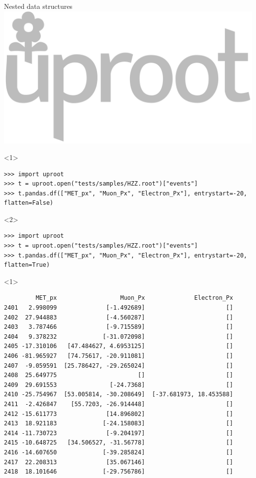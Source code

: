 \documentclass[aspectratio=169]{beamer}
\begin{document}
\begin{frame}[fragile]{Nested data structures}
\tiny
\vspace{0.25 cm}
\hfill \includegraphics[height=1 cm]{uproot-logo.pdf}

\vspace{-1.1 cm}
\begin{onlyenv}<1>\begin{verbatim}
>>> import uproot
>>> t = uproot.open("tests/samples/HZZ.root")["events"]
>>> t.pandas.df(["MET_px", "Muon_Px", "Electron_Px"], entrystart=-20, flatten=False)
\end{verbatim}
\end{onlyenv}\begin{onlyenv}<2>\begin{verbatim}
>>> import uproot
>>> t = uproot.open("tests/samples/HZZ.root")["events"]
>>> t.pandas.df(["MET_px", "Muon_Px", "Electron_Px"], entrystart=-20, flatten=True)
\end{verbatim}
\end{onlyenv}
\begin{onlyenv}<1>\begin{verbatim}
         MET_px                  Muon_Px              Electron_Px
2401   2.998099              [-1.492689]                       []
2402  27.944883              [-4.560287]                       []
2403   3.787466              [-9.715589]                       []
2404   9.378232             [-31.072098]                       []
2405 -17.310106   [47.484627, 4.6953125]                       []
2406 -81.965927   [74.75617, -20.911081]                       []
2407  -9.059591  [25.786427, -29.265024]                       []
2408  25.649775                       []                       []
2409  29.691553               [-24.7368]                       []
2410 -25.754967  [53.005814, -30.208649]  [-37.681973, 18.453588]
2411  -2.426847    [55.7203, -26.914448]                       []
2412 -15.611773              [14.896802]                       []
2413  18.921183             [-24.158083]                       []
2414 -11.730723              [-9.204197]                       []
2415 -10.648725   [34.506527, -31.56778]                       []
2416 -14.607650             [-39.285824]                       []
2417  22.208313              [35.067146]                       []
2418  18.101646             [-29.756786]                       []

\end{verbatim}
\end{onlyenv}
\end{frame}
\end{document}

